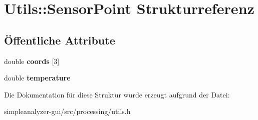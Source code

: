 \hypertarget{structUtils_1_1SensorPoint}{\section{Utils\-:\-:Sensor\-Point Strukturreferenz}
\label{structUtils_1_1SensorPoint}
}
\subsection*{Öffentliche Attribute}
\begin{DoxyCompactItemize}
\item 
\hypertarget{structUtils_1_1SensorPoint_aedff5493c2f6c36e9552dc3807c8ce24}{double {\bfseries coords} \mbox{[}3\mbox{]}}\label{structUtils_1_1SensorPoint_aedff5493c2f6c36e9552dc3807c8ce24}

\item 
\hypertarget{structUtils_1_1SensorPoint_a764d6572f865138b36cb46c910001e9a}{double {\bfseries temperature}}\label{structUtils_1_1SensorPoint_a764d6572f865138b36cb46c910001e9a}

\end{DoxyCompactItemize}


Die Dokumentation für diese Struktur wurde erzeugt aufgrund der Datei\-:\begin{DoxyCompactItemize}
\item 
simpleanalyzer-\/gui/src/processing/utils.\-h\end{DoxyCompactItemize}
